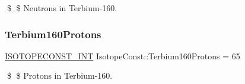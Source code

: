 \$ \$ Neutrons in Terbium-\/160. \mbox{\label{group___isotope_const-_terbium-_tb160_gae76b8fa4c5430a6d603b71c767d3b60d}} 
\subsubsection{\texorpdfstring{Terbium160\+Protons}{Terbium160Protons}}
{\footnotesize\ttfamily \mbox{\hyperlink{group___isotope_const-_macros_ga5f18360b3e99483a35c32d789e62621c}{I\+S\+O\+T\+O\+P\+E\+C\+O\+N\+S\+T\+\_\+\+I\+NT}} Isotope\+Const\+::\+Terbium160\+Protons = 65}

\$ \$ Protons in Terbium-\/160. 